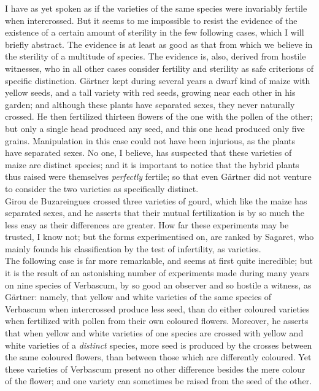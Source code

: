 \indent I have as yet spoken as if the varieties of the same species were invariably fertile when intercrossed. But it seems to me impossible to resist the evidence of the existence of a certain amount of sterility in the few following cases, which I will briefly abstract. The evidence is at least as good as that from which we believe in the sterility of a multitude of species. The evidence is, also, derived from hostile witnesses, who in all other cases consider fertility and sterility as safe criterions of specific distinction. G\"{a}rtner kept during several years a dwarf kind of maize with yellow seeds, and a tall variety with red seeds, growing near each other in his garden; and although these plants have separated sexes, they never naturally crossed. He then fertilized thirteen flowers of the one with the pollen of the other; but only a single head produced any seed, and this one head produced only five grains. Manipulation in this case could not have been injurious, as the plants have separated sexes. No one, I believe, has suspected that these varieties of maize are distinct species; and it is important to notice that the hybrid plants thus raised were themselves \emph{perfectly} fertile; so that even G\"{a}rtner did not venture to consider the two varieties as specifically distinct.\\
\indent Girou de Buzareingues crossed three varieties of gourd, which like the maize has separated sexes, and he asserts that their mutual fertilization is by so much the less easy as their differences are greater. How far these experiments may be trusted, I know not; but the forms experimentised on, are ranked by Sagaret, who mainly founds his classification by the test of infertility, as varieties.\\
\indent The following case is far more remarkable, and seems at first quite incredible; but it is the result of an astonishing number of experiments made during many years on nine species of Verbascum, by so good an observer and so hostile a witness, as G\"{a}rtner: namely, that yellow and white varieties of the same species of Verbascum when intercrossed produce less seed, than do either coloured varieties when fertilized with pollen from their own coloured flowers. Moreover, he asserts that when yellow and white varieties of one species are crossed with yellow and white varieties of a \emph{distinct} species, more seed is produced by the crosses between the same coloured flowers, than between those which are differently coloured. Yet these varieties of Verbascum present no other difference besides the mere colour of the flower; and one variety can sometimes be raised from the seed of the other.\\
